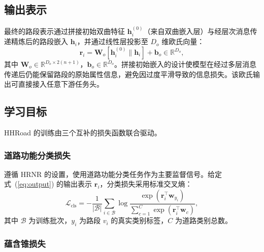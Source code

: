 \subsection{输出表示}

最终的路段表示通过拼接初始双曲特征 $\mathbf{h}_i^{(0)}$（来自双曲嵌入层）与经层次消息传递精炼后的路段嵌入 $\mathbf{h}_i$，并通过线性层投影至 $D_o$ 维欧氏向量：
\begin{equation}
    \mathbf{r}_i = \mathbf{W}_o [\mathbf{h}_i^{(0)} \| \mathbf{h}_i] + \mathbf{b}_o
    \in \mathbb{R}^{D_o},
    \label{eq:output}
\end{equation}
其中 $\mathbf{W}_o \in \mathbb{R}^{D_o \times 2(n+1)}$，$\mathbf{b}_o \in \mathbb{R}^{D_o}$。拼接初始嵌入的设计使模型在经过多层消息传递后仍能保留路段的原始属性信息，避免因过度平滑导致的信息损失。该欧氏输出可直接接入任意下游任务头。

\subsection{学习目标}
\label{sec:loss}

HHRoad 的训练由三个互补的损失函数联合驱动。

\subsubsection{道路功能分类损失}

遵循 HRNR 的设置，使用道路功能分类任务作为主要监督信号。给定式~(\ref{eq:output}) 的输出表示 $\mathbf{r}_i$，分类损失采用标准交叉熵：
\begin{equation}
    \mathcal{L}_{\text{cls}} = -\frac{1}{|\mathcal{B}|} \sum_{i \in \mathcal{B}}
    \log \frac{\exp(\mathbf{r}_i^\top \mathbf{w}_{y_i})}
         {\sum_{c=1}^{C} \exp(\mathbf{r}_i^\top \mathbf{w}_{c})},
    \label{eq:loss_cls}
\end{equation}
其中 $\mathcal{B}$ 为训练批次，$y_i$ 为路段 $v_i$ 的真实类别标签，$C$ 为道路类别总数。

\subsubsection{蕴含锥损失}

